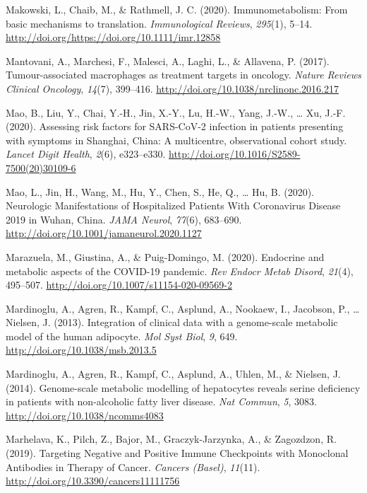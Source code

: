 \documentclass[12pt,twoside,openany,\mydriver]{thesis}  %
\begin{document}
\leavevmode\hypertarget{ref-makowski_immunometabolism_2020}{}%
Makowski, L., Chaib, M., \& Rathmell, J. C. (2020). Immunometabolism: From basic mechanisms to translation. \emph{Immunological Reviews}, \emph{295}(1), 5--14. \url{http://doi.org/https://doi.org/10.1111/imr.12858}

\leavevmode\hypertarget{ref-mantovani_tumour-associated_2017}{}%
Mantovani, A., Marchesi, F., Malesci, A., Laghi, L., \& Allavena, P. (2017). Tumour-associated macrophages as treatment targets in oncology. \emph{Nature Reviews Clinical Oncology}, \emph{14}(7), 399--416. \url{http://doi.org/10.1038/nrclinonc.2016.217}

\leavevmode\hypertarget{ref-mao_assessing_2020}{}%
Mao, B., Liu, Y., Chai, Y.-H., Jin, X.-Y., Lu, H.-W., Yang, J.-W., \ldots{} Xu, J.-F. (2020). Assessing risk factors for SARS-CoV-2 infection in patients presenting with symptoms in Shanghai, China: A multicentre, observational cohort study. \emph{Lancet Digit Health}, \emph{2}(6), e323--e330. \url{http://doi.org/10.1016/S2589-7500(20)30109-6}

\leavevmode\hypertarget{ref-mao_neurologic_2020}{}%
Mao, L., Jin, H., Wang, M., Hu, Y., Chen, S., He, Q., \ldots{} Hu, B. (2020). Neurologic Manifestations of Hospitalized Patients With Coronavirus Disease 2019 in Wuhan, China. \emph{JAMA Neurol}, \emph{77}(6), 683--690. \url{http://doi.org/10.1001/jamaneurol.2020.1127}

\leavevmode\hypertarget{ref-marazuela_endocrine_2020}{}%
Marazuela, M., Giustina, A., \& Puig-Domingo, M. (2020). Endocrine and metabolic aspects of the COVID-19 pandemic. \emph{Rev Endocr Metab Disord}, \emph{21}(4), 495--507. \url{http://doi.org/10.1007/s11154-020-09569-2}

\leavevmode\hypertarget{ref-mardinoglu_integration_2013}{}%
Mardinoglu, A., Agren, R., Kampf, C., Asplund, A., Nookaew, I., Jacobson, P., \ldots{} Nielsen, J. (2013). Integration of clinical data with a genome-scale metabolic model of the human adipocyte. \emph{Mol Syst Biol}, \emph{9}, 649. \url{http://doi.org/10.1038/msb.2013.5}

\leavevmode\hypertarget{ref-mardinoglu_genome-scale_2014}{}%
Mardinoglu, A., Agren, R., Kampf, C., Asplund, A., Uhlen, M., \& Nielsen, J. (2014). Genome-scale metabolic modelling of hepatocytes reveals serine deficiency in patients with non-alcoholic fatty liver disease. \emph{Nat Commun}, \emph{5}, 3083. \url{http://doi.org/10.1038/ncomms4083}

\leavevmode\hypertarget{ref-marhelava_targeting_2019}{}%
Marhelava, K., Pilch, Z., Bajor, M., Graczyk-Jarzynka, A., \& Zagozdzon, R. (2019). Targeting Negative and Positive Immune Checkpoints with Monoclonal Antibodies in Therapy of Cancer. \emph{Cancers (Basel)}, \emph{11}(11). \url{http://doi.org/10.3390/cancers11111756}
\end{document}
